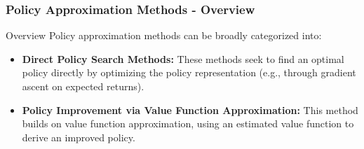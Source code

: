 \documentclass[aspectratio=169]{beamer}
\begin{document}
\begin{frame}[fragile]
    \frametitle{Policy Approximation Methods - Overview}
    \begin{block}{Overview}
        Policy approximation methods can be broadly categorized into:
        \begin{itemize}
            \item \textbf{Direct Policy Search Methods:} 
            These methods seek to find an optimal policy directly by optimizing the policy representation (e.g., through gradient ascent on expected returns).
            \item \textbf{Policy Improvement via Value Function Approximation:} 
            This method builds on value function approximation, using an estimated value function to derive an improved policy.
        \end{itemize}
    \end{block}
\end{frame}
\end{document}
